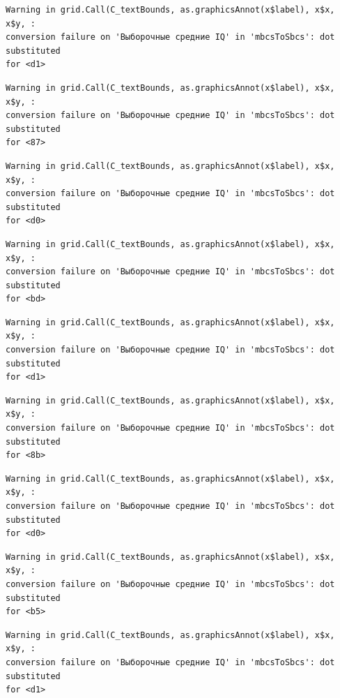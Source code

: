 \documentclass[
  letterpaper,
  DIV=11,
  numbers=noendperiod]{scrreprt}
\theoremstyle{definition}
\theoremstyle{remark}
\begin{document}
\begin{verbatim}
Warning in grid.Call(C_textBounds, as.graphicsAnnot(x$label), x$x, x$y, :
conversion failure on 'Выборочные средние IQ' in 'mbcsToSbcs': dot substituted
for <d1>
\end{verbatim}

\begin{verbatim}
Warning in grid.Call(C_textBounds, as.graphicsAnnot(x$label), x$x, x$y, :
conversion failure on 'Выборочные средние IQ' in 'mbcsToSbcs': dot substituted
for <87>
\end{verbatim}

\begin{verbatim}
Warning in grid.Call(C_textBounds, as.graphicsAnnot(x$label), x$x, x$y, :
conversion failure on 'Выборочные средние IQ' in 'mbcsToSbcs': dot substituted
for <d0>
\end{verbatim}

\begin{verbatim}
Warning in grid.Call(C_textBounds, as.graphicsAnnot(x$label), x$x, x$y, :
conversion failure on 'Выборочные средние IQ' in 'mbcsToSbcs': dot substituted
for <bd>
\end{verbatim}

\begin{verbatim}
Warning in grid.Call(C_textBounds, as.graphicsAnnot(x$label), x$x, x$y, :
conversion failure on 'Выборочные средние IQ' in 'mbcsToSbcs': dot substituted
for <d1>
\end{verbatim}

\begin{verbatim}
Warning in grid.Call(C_textBounds, as.graphicsAnnot(x$label), x$x, x$y, :
conversion failure on 'Выборочные средние IQ' in 'mbcsToSbcs': dot substituted
for <8b>
\end{verbatim}

\begin{verbatim}
Warning in grid.Call(C_textBounds, as.graphicsAnnot(x$label), x$x, x$y, :
conversion failure on 'Выборочные средние IQ' in 'mbcsToSbcs': dot substituted
for <d0>
\end{verbatim}

\begin{verbatim}
Warning in grid.Call(C_textBounds, as.graphicsAnnot(x$label), x$x, x$y, :
conversion failure on 'Выборочные средние IQ' in 'mbcsToSbcs': dot substituted
for <b5>
\end{verbatim}

\begin{verbatim}
Warning in grid.Call(C_textBounds, as.graphicsAnnot(x$label), x$x, x$y, :
conversion failure on 'Выборочные средние IQ' in 'mbcsToSbcs': dot substituted
for <d1>
\end{verbatim}
\end{document}
